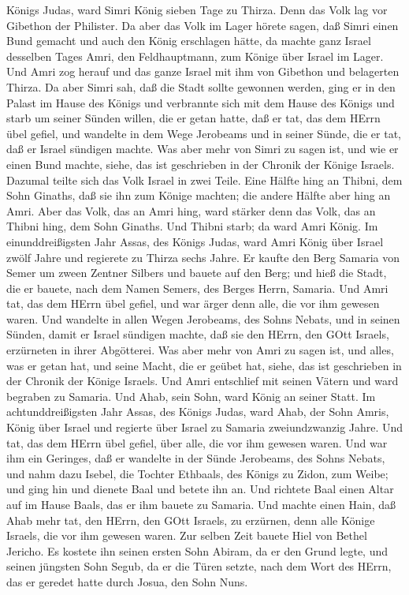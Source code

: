 Königs Judas, ward Simri König sieben Tage zu Thirza. Denn das Volk lag
vor Gibethon der Philister.  Da aber das Volk im Lager
hörete sagen, daß Simri einen Bund gemacht und auch den König erschlagen
hätte, da machte ganz Israel desselben Tages Amri, den Feldhauptmann,
zum Könige über Israel im Lager.  Und Amri zog herauf und
das ganze Israel mit ihm von Gibethon und belagerten Thirza.
 Da aber Simri sah, daß die Stadt sollte gewonnen werden,
ging er in den Palast im Hause des Königs und verbrannte sich mit dem
Hause des Königs und starb  um seiner Sünden willen, die er
getan hatte, daß er tat, das dem HErrn übel gefiel, und wandelte in dem
Wege Jerobeams und in seiner Sünde, die er tat, daß er Israel sündigen
machte.  Was aber mehr von Simri zu sagen ist, und wie er
einen Bund machte, siehe, das ist geschrieben in der Chronik der Könige
Israels.  Dazumal teilte sich das Volk Israel in zwei
Teile. Eine Hälfte hing an Thibni, dem Sohn Ginaths, daß sie ihn zum
Könige machten; die andere Hälfte aber hing an Amri.  Aber
das Volk, das an Amri hing, ward stärker denn das Volk, das an Thibni
hing, dem Sohn Ginaths. Und Thibni starb; da ward Amri König.
 Im einunddreißigsten Jahr Assas, des Königs Judas, ward
Amri König über Israel zwölf Jahre und regierete zu Thirza sechs Jahre.
 Er kaufte den Berg Samaria von Semer um zween Zentner
Silbers und bauete auf den Berg; und hieß die Stadt, die er bauete, nach
dem Namen Semers, des Berges Herrn, Samaria.  Und Amri tat,
das dem HErrn übel gefiel, und war ärger denn alle, die vor ihm gewesen
waren.  Und wandelte in allen Wegen Jerobeams, des Sohns
Nebats, und in seinen Sünden, damit er Israel sündigen machte, daß sie
den HErrn, den GOtt Israels, erzürneten in ihrer Abgötterei.
 Was aber mehr von Amri zu sagen ist, und alles, was er
getan hat, und seine Macht, die er geübet hat, siehe, das ist
geschrieben in der Chronik der Könige Israels.  Und Amri
entschlief mit seinen Vätern und ward begraben zu Samaria. Und Ahab,
sein Sohn, ward König an seiner Statt.  Im
achtunddreißigsten Jahr Assas, des Königs Judas, ward Ahab, der Sohn
Amris, König über Israel und regierte über Israel zu Samaria
zweiundzwanzig Jahre.  Und tat, das dem HErrn übel gefiel,
über alle, die vor ihm gewesen waren.  Und war ihm ein
Geringes, daß er wandelte in der Sünde Jerobeams, des Sohns Nebats, und
nahm dazu Isebel, die Tochter Ethbaals, des Königs zu Zidon, zum Weibe;
und ging hin und dienete Baal und betete ihn an.  Und
richtete Baal einen Altar auf im Hause Baals, das er ihm bauete zu
Samaria.  Und machte einen Hain, daß Ahab mehr tat, den
HErrn, den GOtt Israels, zu erzürnen, denn alle Könige Israels, die vor
ihm gewesen waren.  Zur selben Zeit bauete Hiel von Bethel
Jericho. Es kostete ihn seinen ersten Sohn Abiram, da er den Grund
legte, und seinen jüngsten Sohn Segub, da er die Türen setzte, nach dem
Wort des HErrn, das er geredet hatte durch Josua, den Sohn Nuns.


